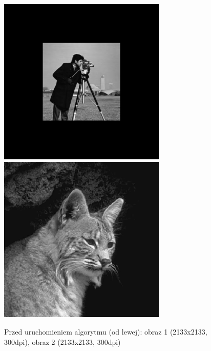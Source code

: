 \documentclass[a4paper,12pt]{book}
\begin{document}
\begin{figure}
	\caption{Przed uruchomieniem algorytmu (od lewej): obraz 1 (2133x2133, 300dpi), obraz 2 (2133x2133, 300dpi)}
	\includegraphics[width=8cm, height=8cm]{man-modified.png}
	\includegraphics[width=8cm, height=8cm]{cat-unmodified.jpg}
\end{figure}
\end{document}
